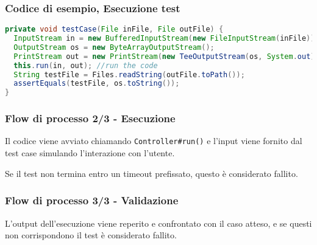 \begin{frame}[fragile]
    \frametitle{Codice di esempio, Esecuzione test}

    \lstset{style=java}
    \begin{lstlisting}[language=java, caption={Snippet tratto da End2EndTest.java}]
private void testCase(File inFile, File outFile) {
  InputStream in = new BufferedInputStream(new FileInputStream(inFile));
  OutputStream os = new ByteArrayOutputStream();
  PrintStream out = new PrintStream(new TeeOutputStream(os, System.out));
  this.run(in, out); //run the code
  String testFile = Files.readString(outFile.toPath());
  assertEquals(testFile, os.toString());
}       
    \end{lstlisting}
\end{frame}

\begin{frame}
    \frametitle{Flow di processo 2/3 - Esecuzione}
    \begin{minipage}{.31\textwidth}
        \begin{figure}
            \centering
        \end{figure}
    \end{minipage}\hfill
    \begin{minipage}{.66\textwidth}
        Il codice viene avviato chiamando \texttt{Controller\#run()} e l'input viene fornito dal test case simulando l'interazione con l'utente.

        Se il test non termina entro un timeout prefissato, questo è considerato fallito.
    \end{minipage}
\end{frame}

\begin{frame}
    \frametitle{Flow di processo 3/3 - Validazione}
    \begin{minipage}{.31\textwidth}
        \begin{figure}
            \centering
        \end{figure}
    \end{minipage}\hfill
    \begin{minipage}{.66\textwidth}
        L'output dell'esecuzione viene reperito e confrontato con il caso atteso, e se questi non corrispondono il test è considerato fallito.
    \end{minipage}
\end{frame}


